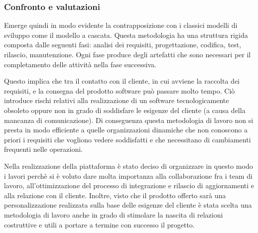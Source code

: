 \subsubsection{Confronto e valutazioni}
Emerge quindi in modo evidente la contrapposizione con i classici modelli di sviluppo come il modello a cascata.
Questa metodologia ha una struttura rigida composta dalle seguenti fasi: analisi dei requisiti, progettazione, codifica, test, rilascio, manutenzione.
Ogni fase produce degli artefatti che sono necessari per il completamento delle attività nella fase successiva.

Questo implica che tra il contatto con il cliente, in cui avviene la raccolta dei requisiti, e la consegna del prodotto software può passare molto tempo.
Ciò introduce rischi relativi alla realizzazione di un software tecnologicamente obsoleto oppure non in grado di soddisfare le
esigenze del cliente (a causa della mancanza di comunicazione).
Di conseguenza questa metodologia di lavoro non si presta in modo efficiente a quelle organizzazioni dinamiche che non conoscono
a priori i requisiti che vogliono vedere soddisfatti e che necessitano di cambiamenti frequenti nelle operazioni.

Nella realizzazione della piattaforma è stato deciso di organizzare in questo modo i lavori perchè si è voluto dare molta importanza
alla collaborazione fra i team di lavoro, all'ottimizzazione del processo di integrazione e rilascio di aggiornamenti e
alla relazione con il cliente. Inoltre, visto che il prodotto offerto sarà una personalizzazione realizzata sulla base delle esigenze del cliente
è stata scelta una metodologia di lavoro anche in grado di stimolare la nascita di relazioni costruttive e utili a portare a termine con successo il progetto.


